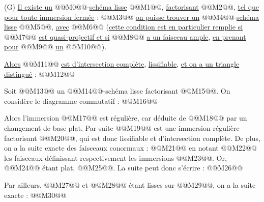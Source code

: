 
(G) \uline{Il
existe un} @@M0@@-\uline{schéma lisse} @@M1@@, \uline{factorisant} @@M2@@, \uline{tel que pour toute immersion fermée} : @@M3@@ \uline{on puisse trouver un} @@M4@@-\uline{schéma lisse} @@M5@@, \uline{avec} @@M6@@ (\uline{cette condition est en particulier remplie si} @@M7@@ \uline{est quasi-projectif et si} @@M8@@ \uline{a un faisceau ample}, \uline{en prenant pour} @@M9@@ \uline{un} @@M10@@).

\uline{Alors} @@M11@@ \uline{est d'intersection complète}, \uline{lissifiable}, \uline{et on a un triangle distingué} :
@@M12@@

Soit @@M13@@ un @@M14@@-schéma lisse factorisant @@M15@@. On considère le diagramme commutatif :
@@M16@@

Alors l'immersion @@M17@@ est régulière, car déduite de @@M18@@ par un changement de base plat. Par suite @@M19@@ est une immersion régulière factorisant @@M20@@, qui est donc lissifiable et d'intersection complète. De plus, on a la suite exacte des faisceaux conormaux :
@@M21@@
en notant @@M22@@ les faisceaux définissant respectivement les immersions @@M23@@. Or, @@M24@@ étant plat, @@M25@@. La suite peut donc s'écrire :
@@M26@@

Par ailleurs, @@M27@@ et @@M28@@ étant lisses sur @@M29@@, on a la suite exacte :
@@M30@@
